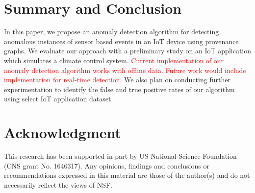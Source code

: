 




\section{Summary and Conclusion}

In this paper, we propose an anomaly detection algorithm for detecting anomalous instances of sensor based events in an IoT device using provenance graphs. We evaluate our approach with a preliminary study on an IoT application which simulates a climate control system.  \textcolor{red}{Current implementation of our anomaly detection algorithm works with offline data. Future work would include implementation for real-time detection. } We also plan on conducting further experimentation to identify the false and true positive rates of our algorithm using select IoT application dataset. 




\section{Acknowledgment}
This research has been supported in part by US National Science Foundation (CNS grant No. 1646317). Any opinions, findings and conclusions or recommendations expressed in this material are those of the author(s) and do not necessarily reflect the views of NSF.



